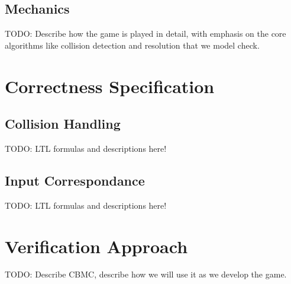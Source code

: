 \documentclass{article}
\begin{document}
    \subsection{Mechanics}

        TODO: Describe how the game is played in detail, with emphasis on the
        core algorithms like collision detection and resolution that we model
        check.

\section{Correctness Specification}

    \subsection{Collision Handling}

        TODO: LTL formulas and descriptions here!

    \subsection{Input Correspondance}

        TODO: LTL formulas and descriptions here!

\section{Verification Approach}

    TODO: Describe CBMC, describe how we will use it as we develop the game.



\end{document}

